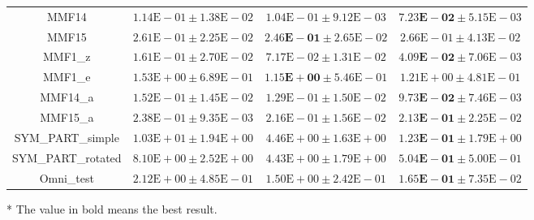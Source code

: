 \begin{table}[htbp]
\begin{tabular}{cccc}
		MMF14 & $1.14\text{E}-01 \pm 1.38\text{E}-02$ & $1.04\text{E}-01 \pm 9.12\text{E}-03$ & $\mathbf{7.23\text{E}-02} \pm 5.15\text{E}-03$\\
		MMF15 & $2.61\text{E}-01 \pm 2.25\text{E}-02$ & $\mathbf{2.46\text{E}-01} \pm 2.65\text{E}-02$ & $2.66\text{E}-01 \pm 4.13\text{E}-02$\\
		MMF1\_z & $1.61\text{E}-01 \pm 2.70\text{E}-02$ & $7.17\text{E}-02 \pm 1.31\text{E}-02$ & $\mathbf{4.09\text{E}-02} \pm 7.06\text{E}-03$\\
		MMF1\_e & $1.53\text{E}+00 \pm 6.89\text{E}-01$ & $\mathbf{1.15\text{E}+00} \pm 5.46\text{E}-01$ & $1.21\text{E}+00 \pm 4.81\text{E}-01$\\
		MMF14\_a & $1.52\text{E}-01 \pm 1.45\text{E}-02$ & $1.29\text{E}-01 \pm 1.50\text{E}-02$ & $\mathbf{9.73\text{E}-02} \pm 7.46\text{E}-03$\\
		MMF15\_a & $2.38\text{E}-01 \pm 9.35\text{E}-03$ & $2.16\text{E}-01 \pm 1.56\text{E}-02$ & $\mathbf{2.13\text{E}-01} \pm 2.25\text{E}-02$\\
		SYM\_PART\_simple & $1.03\text{E}+01 \pm 1.94\text{E}+00$ & $4.46\text{E}+00 \pm 1.63\text{E}+00$ & $\mathbf{1.23\text{E}-01} \pm 1.79\text{E}+00$\\
		SYM\_PART\_rotated & $8.10\text{E}+00 \pm 2.52\text{E}+00$ & $4.43\text{E}+00 \pm 1.79\text{E}+00$ & $\mathbf{5.04\text{E}-01} \pm 5.00\text{E}-01$\\
		Omni\_test & $2.12\text{E}+00 \pm 4.85\text{E}-01$ & $1.50\text{E}+00 \pm 2.42\text{E}-01$ & $\mathbf{1.65\text{E}-01} \pm 7.35\text{E}-02$\\
		\bottomrule
	\end{tabular}
	\begin{tablenotes}
		\item[*] The value in bold means the best result.
	\end{tablenotes}
\end{table}
\renewcommand\arraystretch{0.9}
